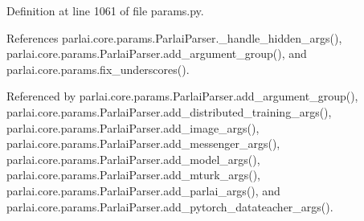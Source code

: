 Definition at line 1061 of file params.\+py.



References parlai.\+core.\+params.\+Parlai\+Parser.\+\_\+handle\+\_\+hidden\+\_\+args(), parlai.\+core.\+params.\+Parlai\+Parser.\+add\+\_\+argument\+\_\+group(), and parlai.\+core.\+params.\+fix\+\_\+underscores().



Referenced by parlai.\+core.\+params.\+Parlai\+Parser.\+add\+\_\+argument\+\_\+group(), parlai.\+core.\+params.\+Parlai\+Parser.\+add\+\_\+distributed\+\_\+training\+\_\+args(), parlai.\+core.\+params.\+Parlai\+Parser.\+add\+\_\+image\+\_\+args(), parlai.\+core.\+params.\+Parlai\+Parser.\+add\+\_\+messenger\+\_\+args(), parlai.\+core.\+params.\+Parlai\+Parser.\+add\+\_\+model\+\_\+args(), parlai.\+core.\+params.\+Parlai\+Parser.\+add\+\_\+mturk\+\_\+args(), parlai.\+core.\+params.\+Parlai\+Parser.\+add\+\_\+parlai\+\_\+args(), and parlai.\+core.\+params.\+Parlai\+Parser.\+add\+\_\+pytorch\+\_\+datateacher\+\_\+args().

